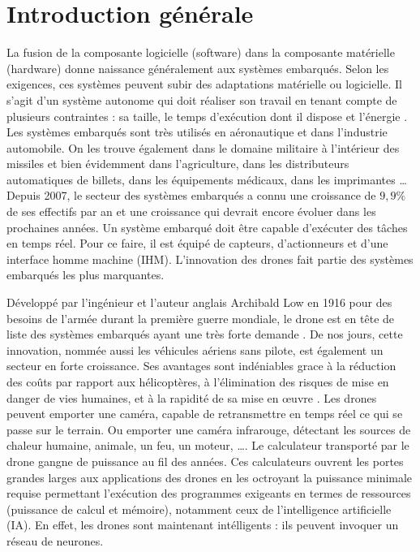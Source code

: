 \chapter*{Introduction générale}
La fusion de la composante logicielle (software) dans la composante matérielle (hardware) donne naissance généralement aux systèmes embarqués.
Selon les exigences, ces systèmes peuvent subir des adaptations matérielle ou logicielle. Il s'agit d'un système autonome qui doit réaliser son travail en tenant compte de plusieurs contraintes : sa taille, le temps d'exécution dont il dispose et l'énergie \cite{FUTURA}. Les systèmes embarqués sont très utilisés en aéronautique et dans l'industrie automobile. On les trouve également dans le domaine militaire à l'intérieur des missiles et bien évidemment dans l'agriculture, dans les distributeurs automatiques de billets, dans les équipements médicaux, dans les imprimantes \ldots
Depuis 2007, le secteur des systèmes embarqués a connu une croissance de $9,9\%$ de ses effectifs par an  et une croissance qui devrait encore évoluer dans les prochaines années\cite{PierreAudoin2012}. 
Un système embarqué doit être capable d'exécuter des tâches en temps réel. 
Pour ce faire, il est équipé de capteurs, d'actionneurs et d'une interface homme machine (IHM). 
L'innovation des drones fait partie des systèmes embarqués les plus marquantes. 

Développé par l'ingénieur et l'auteur anglais Archibald Low en 1916 pour des besoins de l'armée durant la première guerre mondiale, le drone est en tête de liste des systèmes embarqués ayant une très forte demande \cite{STUDIOFLY}. 
De nos jours, cette innovation, nommée aussi les véhicules aériens sans pilote, est également un secteur en forte croissance. 
Ses avantages sont indéniables grace à la réduction des coûts par rapport aux hélicoptères, à l'élimination des risques de mise en danger de vies humaines, et à la rapidité de sa mise en œuvre \cite{AltiGator}. 
Les drones peuvent emporter une caméra, capable de retransmettre en temps réel ce qui se passe sur le terrain. 
Ou emporter une caméra infrarouge, détectant les sources de chaleur humaine, animale, un feu, un moteur, \ldots .
Le calculateur transporté par le drone gangne de puissance au fil des années. Ces calculateurs ouvrent les portes grandes larges aux applications des drones en les octroyant la puissance minimale requise permettant l'exécution des programmes exigeants en termes de ressources (puissance de calcul et mémoire), notamment ceux de l'intelligence artificielle (IA). En effet, les drones sont maintenant intélligents : ils peuvent invoquer un réseau de neurones.

